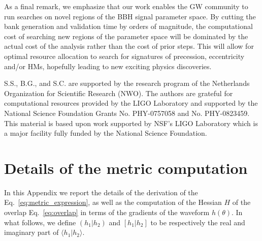 \documentclass[twocolumn,showpacs,preprintnumbers,nofootinbib,prd,
superscriptaddress,10pt]{revtex4-2}
\newcommand{\scalar}[2]{\langle #1|#2 \rangle}
\newcommand{\rescalar}[2]{( #1 |#2 )}
\newcommand{\imscalar}[2]{[ #1|#2 ]}
\begin{document}
As a final remark, we emphasize that our work enables the GW community to run searches on novel regions of the BBH signal parameter space. By cutting the bank generation and validation time by orders of magnitude, the computational cost of searching new regions of the parameter space will be dominated by the actual cost of the analysis rather than the cost of prior steps.
This will allow for optimal resource allocation to search for signatures of precession, eccentricity and/or HMs, hopefully leading to new exciting physics discoveries.

        \begin{acknowledgments}
		S.S., B.G., and S.C. are supported by the research program of the Netherlands Organization for Scientific Research (NWO).
		The authors are grateful for computational resources provided by the LIGO Laboratory and supported by the National Science Foundation Grants No. PHY-0757058 and No. PHY-0823459. This material is based upon work supported by NSF’s LIGO Laboratory which is a major facility fully funded by the National Science Foundation.
        \end{acknowledgments}

\appendix

\section{Details of the metric computation}\label{app:metric}

In this Appendix we report the details of the derivation of the Eq.~\eqref{eq:metric_expression}, as well as the computation of the Hessian $H$ of the overlap Eq.~\eqref{eq:overlap} in terms of the gradients of the waveform $h(\theta)$. 
In what follows, we define $\rescalar{h_1}{h_2}$ and $\imscalar{h_1}{h_2}$ to be respectively the real and imaginary part of $\scalar{h_1}{h_2}$.
\end{document}
